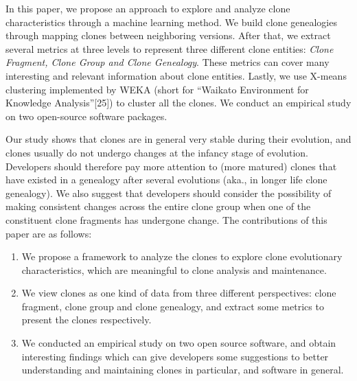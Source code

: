 
In this paper, we propose an approach to explore and analyze clone characteristics through a machine learning method. We build clone genealogies through mapping clones between neighboring versions. After that, we extract several metrics at three levels to represent three different clone entities: {\em Clone Fragment, Clone Group and Clone Genealogy}. These metrics can cover many interesting and relevant information about clone entities. Lastly, we use  X-means clustering implemented by WEKA (short for ``Waikato Environment for Knowledge Analysis''[25]) to cluster all the clones.
We conduct an empirical study on two open-source software packages. 

Our study 
shows that clones are in general very stable during their evolution, and clones usually do not undergo changes at the infancy stage of evolution. Developers should therefore pay more attention to (more matured) clones that have existed in a genealogy after several evolutions (aka., in longer life clone genealogy). We also suggest that developers should consider the possibility of making consistent changes across the entire clone group when one of the constituent clone fragments has undergone change.  The contributions of this paper are as follows:
\begin{enumerate}
\setlength{\itemsep}{0pt}
\setlength{\parsep}{0pt}
\setlength{\parskip}{0pt}
\item  We propose a framework to analyze the clones to explore clone evolutionary characteristics, which are meaningful to clone analysis and maintenance.
\item We view clones as one kind of data from three different perspectives: clone fragment, clone group and clone genealogy, and extract some metrics to present the clones respectively.
\item  We conducted an empirical study on two open source software, and obtain interesting findings which can give developers some suggestions to better understanding and maintaining clones in particular, and software in general.
\end{enumerate}

